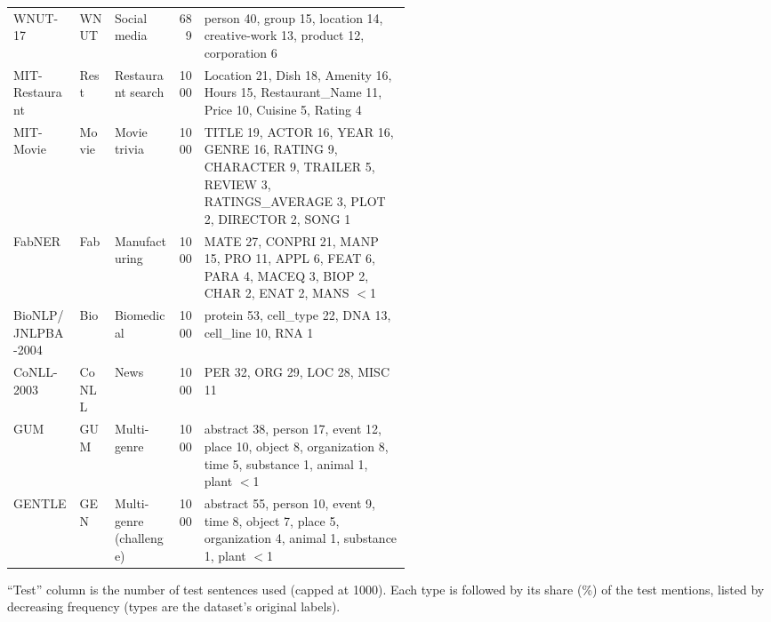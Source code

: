 \begin{table}[tp]
\begin{adjustbox}{max width=\textwidth}
\begin{threeparttable}
\begin{tabular}{@{}lllr>{\raggedright\arraybackslash}p{0.52\linewidth}@{}}
\addlinespace
WNUT-17 & WNUT & Social media & 689 & person 40, group 15, location 14, creative-work 13, product 12, corporation 6 \\
\addlinespace
MIT-Restaurant & Rest & Restaurant search & 1000 & Location 21, Dish 18, Amenity 16, Hours 15, Restaurant\_Name 11, Price 10, Cuisine 5, Rating 4 \\
\addlinespace
MIT-Movie & Movie & Movie trivia & 1000 & TITLE 19, ACTOR 16, YEAR 16, GENRE 16, RATING 9, CHARACTER 9, TRAILER 5, REVIEW 3, RATINGS\_AVERAGE 3, PLOT 2, DIRECTOR 2, SONG 1 \\
\addlinespace
FabNER & Fab & Manufacturing & 1000 & MATE 27, CONPRI 21, MANP 15, PRO 11, APPL 6, FEAT 6, PARA 4, MACEQ 3, BIOP 2, CHAR 2, ENAT 2, MANS $<$1 \\
\addlinespace
BioNLP/JNLPBA-2004 & Bio & Biomedical & 1000 & protein 53, cell\_type 22, DNA 13, cell\_line 10, RNA 1 \\
\addlinespace
CoNLL-2003 & CoNLL & News & 1000 & PER 32, ORG 29, LOC 28, MISC 11 \\
\addlinespace
GUM & GUM & Multi-genre & 1000 & abstract 38, person 17, event 12, place 10, object 8, organization 8, time 5, substance 1, animal 1, plant $<$1 \\
\addlinespace
GENTLE & GEN & Multi-genre (challenge) & 1000 & abstract 55, person 10, event 9, time 8, object 7, place 5, organization 4, animal 1, substance 1, plant $<$1 \\
\bottomrule
\end{tabular}
\begin{tablenotes}[flushleft]
\footnotesize
\item ``Test'' column is the number of test sentences used (capped at 1000). Each type is followed by its share (\%) of the test mentions, listed by decreasing frequency (types are the dataset's original labels).
\end{tablenotes}
\end{threeparttable}
\end{adjustbox}
\end{table}

